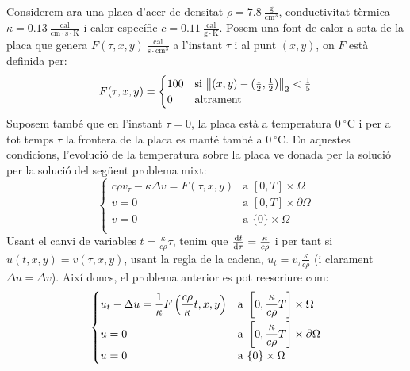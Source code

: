 \documentclass[10pt,a4paper]{article}
\theoremstyle{definition}
\theoremstyle{remark}
\begin{document}
Considerem ara una placa d'acer de densitat $\rho= 7.8\ \frac{\mathrm{g}}{\mathrm{cm}^3}$, conductivitat tèrmica $\kappa = 0.13\ \frac{\mathrm{cal}}{\mathrm{cm}\cdot\mathrm{s}\cdot\mathrm{K}}$ i calor específic $c=0.11\ \frac{\mathrm{cal}}{\mathrm{g}\cdot\mathrm{K}}$. Posem una font de calor a sota de la placa que genera $F(\tau, x,y) \ \frac{\mathrm{cal}}{\mathrm{s}\cdot\mathrm{cm}^3}$ a l'instant $\tau$ i al punt $(x,y)$, on $F$ està definida per:
$$
  F(\tau, x,y) = \begin{cases}
    100 & \text{si } \norm{(x,y)-(\frac{1}{2},\frac{1}{2})}_2 <\frac{1}{5} \\
    0   & \text{altrament}
  \end{cases}
$$
Suposem també que en l'instant $\tau=0$, la placa està a temperatura $0\ ^\circ\mathrm{C}$ i per a tot temps $\tau$ la frontera de la placa es manté també a $0\ ^\circ\mathrm{C}$. En aquestes condicions, l'evolució de la temperatura sobre la placa ve donada per la solució per la solució del següent problema mixt:
$$
  \begin{cases}
    c\rho v_{\tau} -\kappa \Delta v = F(\tau,x,y) & \text{a } [0,T] \times \Omega         \\
    v=0                                           & \text{a } [0,T] \times \partial\Omega \\
    v=0                                           & \text{a } \{0\} \times \Omega         \\
  \end{cases}
$$
Usant el canvi de variables $t=\frac{\kappa}{c\rho}\tau$, tenim que $\dv{t}{\tau}= \frac{\kappa}{c\rho}$ i per tant si $u(t,x,y)=v(\tau,x,y)$, usant la regla de la cadena, $u_t = v_\tau \frac{\kappa}{c\rho}$ (i clarament $\Delta u=\Delta v$). Així doncs, el problema anterior es pot reescriure com:
$$
  \begin{cases}
    \displaystyle u_t -\Delta u = \frac{1}{\kappa} F\left(\frac{c\rho}{\kappa}t,x,y\right) & \displaystyle\text{a } \left[0,\frac{\kappa}{c\rho}T\right] \times \Omega  \vspace{0.1cm} \\
    u=0                                                                                    & \displaystyle\text{a } \left[0,\frac{\kappa}{c\rho}T\right] \times \partial\Omega         \\
    u=0                                                                                    & \text{a } \{0\} \times \Omega                                                             \\
  \end{cases}
$$
\end{document}
